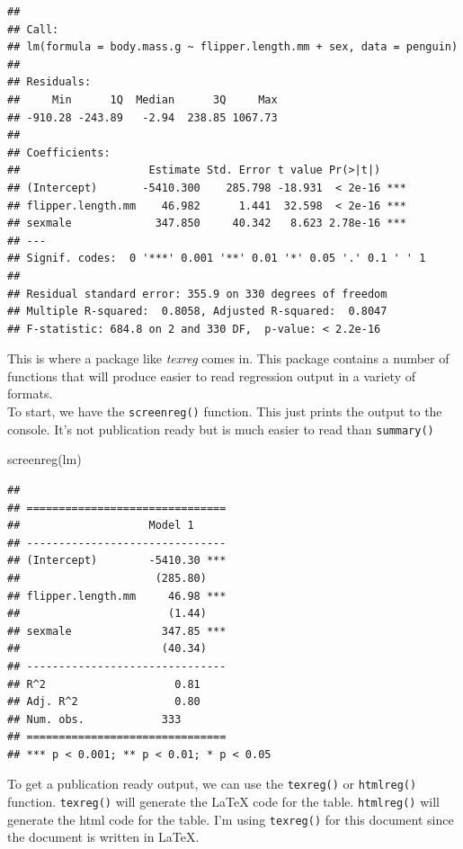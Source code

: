 \documentclass[
]{article}
\newenvironment{Shaded}{\begin{snugshade}}{\end{snugshade}}
\newcommand{\FunctionTok}[1]{\textcolor[rgb]{0.00,0.00,0.00}{#1}}
\newcommand{\NormalTok}[1]{#1}
\begin{document}
\begin{verbatim}
## 
## Call:
## lm(formula = body.mass.g ~ flipper.length.mm + sex, data = penguin)
## 
## Residuals:
##     Min      1Q  Median      3Q     Max 
## -910.28 -243.89   -2.94  238.85 1067.73 
## 
## Coefficients:
##                    Estimate Std. Error t value Pr(>|t|)    
## (Intercept)       -5410.300    285.798 -18.931  < 2e-16 ***
## flipper.length.mm    46.982      1.441  32.598  < 2e-16 ***
## sexmale             347.850     40.342   8.623 2.78e-16 ***
## ---
## Signif. codes:  0 '***' 0.001 '**' 0.01 '*' 0.05 '.' 0.1 ' ' 1
## 
## Residual standard error: 355.9 on 330 degrees of freedom
## Multiple R-squared:  0.8058, Adjusted R-squared:  0.8047 
## F-statistic: 684.8 on 2 and 330 DF,  p-value: < 2.2e-16
\end{verbatim}

This is where a package like \emph{texreg} comes in. This package
contains a number of functions that will produce easier to read
regression output in a variety of formats.\\
To start, we have the \texttt{screenreg()} function. This just prints
the output to the console. It's not publication ready but is much easier
to read than \texttt{summary()}

\begin{Shaded}
\begin{Highlighting}[]
\FunctionTok{screenreg}\NormalTok{(lm)}
\end{Highlighting}
\end{Shaded}

\begin{verbatim}
## 
## ===============================
##                    Model 1     
## -------------------------------
## (Intercept)        -5410.30 ***
##                     (285.80)   
## flipper.length.mm     46.98 ***
##                       (1.44)   
## sexmale              347.85 ***
##                      (40.34)   
## -------------------------------
## R^2                    0.81    
## Adj. R^2               0.80    
## Num. obs.            333       
## ===============================
## *** p < 0.001; ** p < 0.01; * p < 0.05
\end{verbatim}

\pagebreak

To get a publication ready output, we can use the \texttt{texreg()} or
\texttt{htmlreg()} function. \texttt{texreg()} will generate the LaTeX
code for the table. \texttt{htmlreg()} will generate the html code for
the table. I'm using \texttt{texreg()} for this document since the
document is written in LaTeX.
\end{document}
